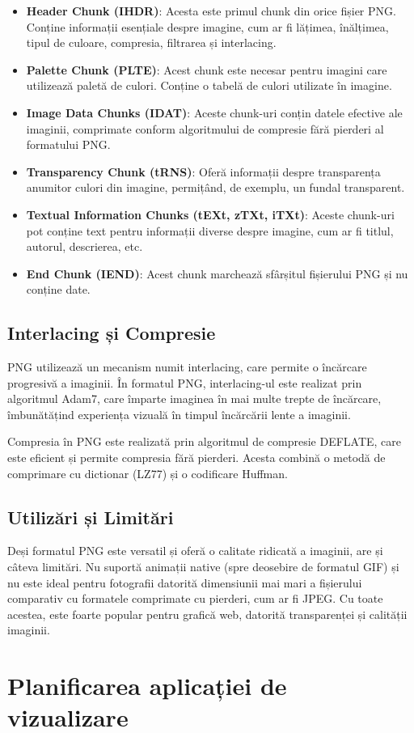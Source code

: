 \documentclass[a4paper,12pt]{report}
\begin{document}
\begin{itemize}
  \item
  \textbf{Header Chunk (IHDR)}: Acesta este primul chunk din orice fișier PNG.
  Conține informații esențiale despre imagine, cum ar fi lățimea,
  înălțimea, tipul de culoare, compresia, filtrarea și interlacing.

  \item
  \textbf{Palette Chunk (PLTE)}: Acest chunk este necesar pentru imagini
  care utilizează paletă de culori.
  Conține o tabelă de culori utilizate în imagine.

  \item
  \textbf{Image Data Chunks (IDAT)}: Aceste chunk-uri conțin datele efective ale imaginii,
  comprimate conform algoritmului de compresie fără pierderi al formatului PNG.

  \item
  \textbf{Transparency Chunk (tRNS)}: Oferă informații despre transparența anumitor culori din imagine, 
  permițând, de exemplu, un fundal transparent.

  \item
  \textbf{Textual Information Chunks (tEXt, zTXt, iTXt)}: Aceste chunk-uri pot conține text
  pentru informații diverse despre imagine, cum ar fi titlul, autorul, descrierea, etc.

  \item
  \textbf{End Chunk (IEND)}: Acest chunk marchează sfârșitul fișierului PNG și nu conține date.
\end{itemize}

\subsection{Interlacing și Compresie}

PNG utilizează un mecanism numit interlacing, care permite o încărcare progresivă a imaginii.
În formatul PNG, interlacing-ul este realizat prin algoritmul Adam7,
care împarte imaginea în mai multe trepte de încărcare,
îmbunătățind experiența vizuală în timpul încărcării lente a imaginii.

Compresia în PNG este realizată prin algoritmul de compresie DEFLATE,
care este eficient și permite compresia fără pierderi.
Acesta combină o metodă de comprimare cu dictionar (LZ77) și o codificare Huffman.

\subsection{Utilizări și Limitări}

Deși formatul PNG este versatil și oferă o calitate ridicată a imaginii, are și câteva limitări.
Nu suportă animații native (spre deosebire de formatul GIF)
și nu este ideal pentru fotografii datorită dimensiunii mai mari a fișierului comparativ
cu formatele comprimate cu pierderi, cum ar fi JPEG.
Cu toate acestea, este foarte popular pentru grafică web,
datorită transparenței și calității imaginii.


\section{Planificarea aplicației de vizualizare}
\end{document}
